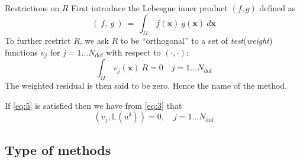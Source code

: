 \begin{frame}{Restrictions on $R$}
  First introduce the Lebesgue inner product $(f,g)$ defined as
  \begin{equation}
    \label{eq:4}
    (\ f,\ g\ )\ =\ \int_\Omega \ f(\mathbf{x})\ g(\mathbf{x})\ d\mathbf{x}
  \end{equation}
  To further restrict $R$, we ask $R$ to be ``orthogonal'' to a set of
  \emph{test}(\emph{weight}) functions $v_j$ for
  $j=1...N_{\text{dof}}$ with respect to $(\cdot, \cdot)$:
  \begin{equation}
    \label{eq:5}
    \int_\Omega\ v_j(\mathbf{x})\ R  = 0 \quad j = 1 ... N_{\text{dof}}
  \end{equation}
  The weighted residual is then said to be zero. Hence the name of the method.

  If \eqref{eq:5} is satisfied then we have from \eqref{eq:3} that
  \begin{equation}
    \label{eq:58}
    (v_j, \mathbb{L}(u^\delta) ) = 0, \quad j=1...N_{\text{dof}}
  \end{equation}
\end{frame}

\subsection{Type of methods}
\label{sec:type-methods}

